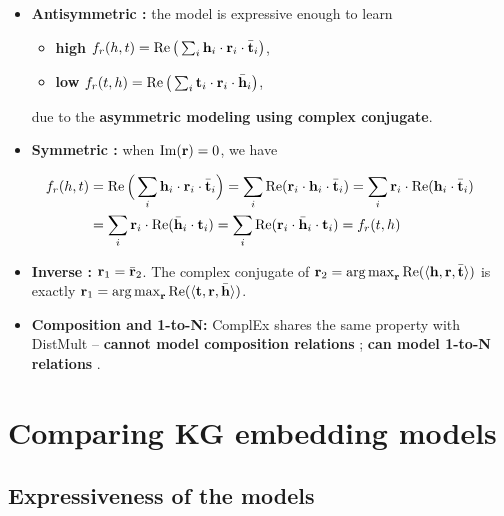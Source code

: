 \begin{itemize}
  \item \textbf{Antisymmetric \cmark:} the model is expressive enough to learn
    \begin{itemize}
      \item \textbf{high} $f_r(h,t)=\operatorname{Re}\big(\sum_i\mathbf{h}_i\cdot\mathbf{r}_i\cdot\bar{\mathbf{t}}_i\big)$,
      \item \textbf{low} $f_r(t,h)=\operatorname{Re}\big(\sum_i\mathbf{t}_i\cdot\mathbf{r}_i\cdot\bar{\mathbf{h}}_i\big)$,
    \end{itemize}
    due to the \textbf{asymmetric modeling using complex conjugate}.
  \item \textbf{Symmetric \cmark:} when $\operatorname{Im}(\mathbf{r})=0$, we have
\end{itemize}
\begin{align}
  f_r(h,t)&=\operatorname{Re}\Big(\sum_i\mathbf{h}_i\cdot\mathbf{r}_i\cdot\bar{\mathbf{t}}_i\Big)
    =\sum_i\operatorname{Re}(\mathbf{r}_i\cdot\mathbf{h}_i\cdot\bar{\mathbf{t}}_i)
    =\sum_i\mathbf{r}_i\cdot\operatorname{Re}(\mathbf{h}_i\cdot\bar{\mathbf{t}}_i)\notag\\
  &=\sum_i\mathbf{r}_i\cdot\operatorname{Re}(\bar{\mathbf{h}}_i\cdot\mathbf{t}_i)
    =\sum_i\operatorname{Re}(\mathbf{r}_i\cdot\bar{\mathbf{h}}_i\cdot\mathbf{t}_i)=f_r(t,h)
  \label{eq:lec10-complex-sym}
\end{align}
\begin{itemize}
  \item \textbf{Inverse \cmark:} $\mathbf{r}_1=\bar{\mathbf{r}}_2$. The complex conjugate of
    $\mathbf{r}_2=\operatorname*{arg\,max}_{\mathbf{r}}\operatorname{Re}(\langle\mathbf{h},\mathbf{r},\bar{\mathbf{t}}\rangle)$ is exactly
    $\mathbf{r}_1=\operatorname*{arg\,max}_{\mathbf{r}}\operatorname{Re}(\langle\mathbf{t},\mathbf{r},\bar{\mathbf{h}}\rangle)$.
  \item \textbf{Composition and 1-to-N:} ComplEx shares the same property with
    DistMult -- \textbf{cannot model composition relations} \xmark; \textbf{can
    model 1-to-N relations} \cmark.
\end{itemize}

\section{Comparing KG embedding models}\label{sec:lec10-compare}

\subsection{Expressiveness of the models}\label{sec:lec10-table}

